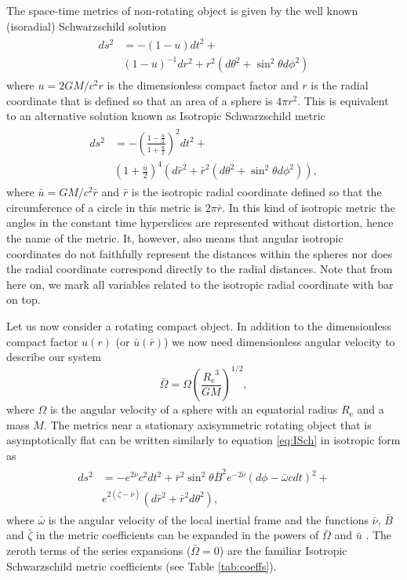 \documentclass[iop, usenatbib]{emulateapj}
\newcommand{\be}{\begin{equation}}
\newcommand{\ee}{\end{equation}}
\newcommand{\Req}{\ensuremath{R_{\mathrm{e}}}}
\newcommand{\sch}{Schwarzschild }
\newcommand{\rb}{\ensuremath{\bar{r}}}
\renewcommand{\ub}{\ensuremath{\bar{u}}}
\newcommand{\wb}{\ensuremath{\bar{\omega}}}
\newcommand{\Ob}{\ensuremath{\bar{\Omega}}}
\newcommand{\nub}{\ensuremath{\bar{\nu}}}
\newcommand{\zetab}{\ensuremath{\bar{\zeta}}}
\newcommand{\Bb}{\ensuremath{\bar{B}}}
\begin{document}
The space-time metrics of non-rotating object is given by the well known (isoradial) \sch solution
\begin{align}\begin{split}
ds^2 & = -(1-u)dt^2 + \\
     & (1-u)^{-1}dr^2+r^2(d\theta^2+\sin^2\theta d\phi^2)
\end{split}\end{align}
where $u = 2GM/c^2 r$ is the dimensionless compact factor and $r$ is the radial coordinate that is defined so that an area of a sphere is $4\pi r^2$.
This is equivalent to an alternative solution known as Isotropic \sch metric \citep[see for e.g.][]{MTW73}
\begin{align}\begin{split}
\label{eq:ISch}
ds^2 & = -\left( \frac{1-\frac{\ub}{2}}{1+\frac{\ub}{2}} \right)^2 dt^2 + \\
     & (1+\frac{\ub}{2})^4(d\rb^2 + \rb^2(d\theta^2+\sin^2\theta d\phi^2)),
\end{split}\end{align}
where $\ub=GM/c^2\rb$ and $\rb$ is the isotropic radial coordinate defined so that the circumference of a circle in this metric is $2\pi\rb$.
In this kind of isotropic metric the angles in the constant time hyperslices are represented without distortion, hence the name of the metric.
It, however, also means that angular isotropic coordinates do not faithfully represent the distances within the spheres nor does the radial coordinate correspond directly to the radial distances.
Note that from here on, we mark all variables related to the isotropic radial coordinate with bar on top.

Let us now consider a rotating compact object.
In addition to the dimensionless compact factor $u(r)$ (or $\ub(\rb)$) we now need dimensionless angular velocity to describe our system
\be
\Ob = \Omega \left( \frac{\Req^3}{G M} \right)^{1/2},
\ee
where $\Omega$ is the angular velocity of a sphere with an equatorial radius $\Req$ and a mass $M$.
The metrics near a stationary axisymmetric rotating object that is asymptotically flat can be written similarly to equation \eqref{eq:ISch} in isotropic form as \citep{BW71} 
\begin{align}\begin{split} \label{eq:BWmetric}
ds^2 & = -e^{2\nub}c^2dt^2 +
     \rb^2 \sin^2\theta \Bb^2 e^{-2\nub}(d\phi - \wb cdt)^2 + \\
     & e^{2(\zetab-\nub)}(d\rb^2 + \rb^2d\theta^2),
\end{split}\end{align}
where $\wb$ is the angular velocity of the local inertial frame and the functions $\nub$, $\Bb$ and $\zetab$ in the metric coefficients can be expanded in the powers of $\Ob$ and $\ub$ \citep{BI76}.
The zeroth terms of the series expansions ($\Ob = 0$) are the familiar Isotropic \sch metric coefficients (see Table \ref{tab:coeffs}).
\end{document}

